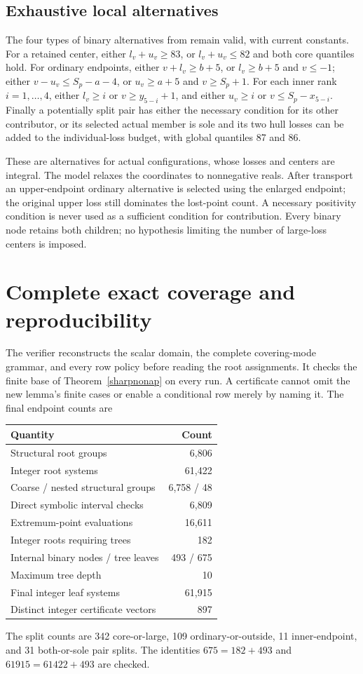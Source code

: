 \documentclass[11pt,a4paper]{article}
\begin{document}
\subsection{Exhaustive local alternatives}
The four types of binary alternatives from \cite{previous} remain valid,
with current constants. For a retained center, either $l_v+u_v\ge83$,
or $l_v+u_v\le82$ and both core quantiles hold. For ordinary endpoints,
either $v+l_v\ge b+5$, or $l_v\ge b+5$ and $v\le-1$; either
$v-u_v\le S_p-a-4$, or $u_v\ge a+5$ and $v\ge S_p+1$.
For each inner rank $i=1,\ldots,4$, either $l_v\ge i$ or
$v\ge y_{5-i}+1$, and either $u_v\ge i$ or $v\le S_p-x_{5-i}$.
Finally a potentially split pair has either the necessary condition
for its other contributor, or its selected actual member is sole and
its two hull losses can be added to the individual-loss budget, with
global quantiles 87 and 86.

These are alternatives for actual configurations, whose losses and
centers are integral. The model relaxes the coordinates to nonnegative
reals. After transport an upper-endpoint ordinary alternative is
selected using the enlarged endpoint; the original upper loss still
dominates the lost-point count. A necessary positivity condition is
never used as a sufficient condition for contribution. Every binary
node retains both children; no hypothesis limiting the number of
large-loss centers is imposed.

\section{Complete exact coverage and reproducibility}
The verifier reconstructs the scalar domain, the complete covering-mode
grammar, and every row policy before reading the root assignments.
It checks the finite base of Theorem~\ref{sharpnonap} on every run.
A certificate cannot omit the new lemma's finite cases or enable a
conditional row merely by naming it. The final endpoint counts are
\begin{center}
\begin{tabular}{lr}\toprule
Quantity&Count\\\midrule
Structural root groups&6,806\\
Integer root systems&61,422\\
Coarse / nested structural groups&6,758 / 48\\
Direct symbolic interval checks&6,809\\
Extremum-point evaluations&16,611\\
Integer roots requiring trees&182\\
Internal binary nodes / tree leaves&493 / 675\\
Maximum tree depth&10\\
Final integer leaf systems&61,915\\
Distinct integer certificate vectors&897\\\bottomrule
\end{tabular}
\end{center}
The split counts are 342 core-or-large, 109 ordinary-or-outside,
11 inner-endpoint, and 31 both-or-sole pair splits. The identities
$675=182+493$ and $61915=61422+493$ are checked.
\end{document}
